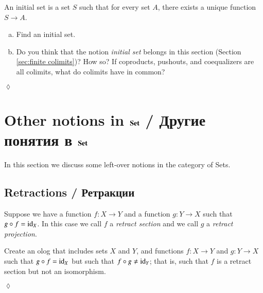 \documentclass{book}
\def\tn{\textnormal}
\def\to{\rightarrow}
\def\taking{\colon}
\def\id{\tn{id}}
\def\Set{{\bf Set}}
\theoremstyle{theoremENG}
\theoremstyle{lemmaENG}
\theoremstyle{propositionENG}
\theoremstyle{corollaryENG}
\theoremstyle{factENG}
\theoremstyle{remarkENG}
\theoremstyle{exampleENG}
\theoremstyle{warningENG}
\theoremstyle{questionENG}
\theoremstyle{guessENG}
\theoremstyle{answerENG}
\theoremstyle{constructionENG}
\theoremstyle{rulesENG}
\theoremstyle{excENG}
\newtheorem{excENG}[subsubsection]{\begin{english}Exercise\end{english}}
\theoremstyle{appENG}
\theoremstyle{definitionENG}
\newtheorem{definitionENG}[subsubsection]{\begin{english}Definition\end{english}}
\theoremstyle{notationENG}
\theoremstyle{conjectureENG}
\theoremstyle{postulateENG}
\newenvironment{exerciseENG}{\begin{excENG}}{\hspace*{\fill}$\lozenge$\end{excENG}}
\theoremstyle{theoremRUS}
\theoremstyle{lemmaRUS}
\theoremstyle{propositionRUS}
\theoremstyle{corollaryRUS}
\theoremstyle{factRUS}
\theoremstyle{remarkRUS}
\theoremstyle{exampleRUS}
\theoremstyle{warningRUS}
\theoremstyle{questionRUS}
\theoremstyle{guessRUS}
\theoremstyle{answerRUS}
\theoremstyle{constructionRUS}
\theoremstyle{rulesRUS}
\theoremstyle{excRUS}
\theoremstyle{appRUS}
\theoremstyle{definitionRUS}
\theoremstyle{notationRUS}
\theoremstyle{conjectureRUS}
\theoremstyle{postulateRUS}
\def\sexc{\begin{enumerate}[a.)]\setlength{\itemsep}{.1cm}\setlength{\parskip}{.1cm}\item}
\def\next{\item}
\def\endsexc{\end{enumerate}}
\begin{document}
\begin{english}
\begin{exerciseENG}[Initial object]\label{exc:initial set}

An initial set is a set $S$ such that for every set $A$, there exists a unique function $S\to A$. 
\sexc Find an initial set. 
\next Do you think that the notion {\em initial set} belongs in this section (Section \ref{sec:finite colimits})? How so? If coproducts, pushouts, and coequalizers are all colimits, what do colimits have in common?
\endsexc

\begin{russian} \end{russian}

\end{exerciseENG}


\section{Other notions in $\Set$ / Другие понятия в $\Set$}

In this section we discuss some left-over notions in the category of Sets.

\begin{russian} \end{russian}


\subsection{Retractions / Ретракции}

\begin{definitionENG}

Suppose we have a function $f\taking X\to Y$ and a function $g\taking Y\to X$ such that $g\circ f=\id_X$. In this case we call $f$ a {\em retract section} and we call $g$ a {\em retract projection}. 

\begin{russian} \end{russian}

\end{definitionENG}

\begin{exerciseENG}

Create an olog that includes sets $X$ and $Y$, and functions $f\taking X\to Y$ and $g\taking Y\to X$ such that $g\circ f=\id_X$ but such that $f\circ g\neq\id_Y$; that is, such that $f$ is a retract section but not an isomorphism.


\end{exerciseENG}
\end{english}
\end{document}
